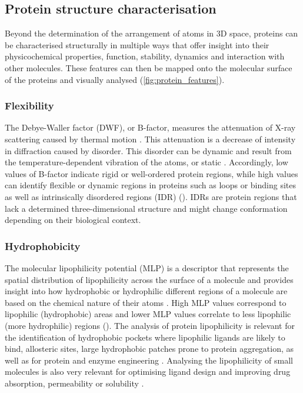 \subsection{Protein structure characterisation}

Beyond the determination of the arrangement of atoms in 3D space, proteins can be characterised structurally in multiple ways that offer insight into their physicochemical properties, function, stability, dynamics and interaction with other molecules. These features can then be mapped onto the molecular surface of the proteins and visually analysed (\autoref{fig:protein_features}).

\subsubsection{Flexibility}

The Debye-Waller factor (DWF), or B-factor, measures the attenuation of X-ray scattering caused by thermal motion \cite{DEBYE_1913_BFACTOR, WALLER_1923_BFACTOR}. This attenuation is a decrease of intensity in diffraction caused by disorder. This disorder can be dynamic and result from the temperature-dependent vibration of the atoms, or static \cite{SUN_2019_BFACTOR}. Accordingly, low values of B-factor indicate rigid or well-ordered protein regions, while high values can identify flexible or dynamic regions in proteins such as loops or binding sites as well as intrinsically disordered regions (IDR) (). IDRs are protein regions that lack a determined three-dimensional structure and might change conformation depending on their biological context.

\subsubsection{Hydrophobicity}

The molecular lipophilicity potential (MLP) is a descriptor that represents the spatial distribution of lipophilicity across the surface of a molecule and provides insight into how hydrophobic or hydrophilic different regions of a molecule are based on the chemical nature of their atoms \cite{BROTO_1984_MLP, LAGUERRE_1997_MLP}. High MLP values correspond to lipophilic (hydrophobic) areas and lower MLP values correlate to less lipophilic (more hydrophilic) regions (). The analysis of protein lipophilicity is relevant for the identification of hydrophobic pockets where lipophilic ligands are likely to bind, allosteric sites, large hydrophobic patches prone to protein aggregation, as well as for protein and enzyme engineering \cite{EFREMOV_2007_MLP}. Analysing the lipophilicity of small molecules is also very relevant for optimising ligand design and improving drug absorption, permeability or solubility \cite{GAILLARD_1994_MLP}.


